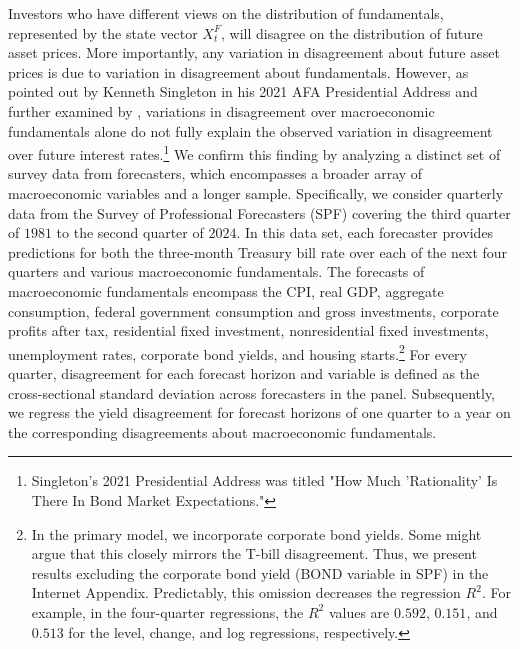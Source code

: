 \documentclass[preprint,11pt,authoryear]{elsarticle}
\theoremstyle{plain}
\begin{document}
Investors who have different views on the distribution of fundamentals, represented by the state vector $X_t^F$, will disagree on the distribution of future asset prices. More importantly, any variation in disagreement about future asset prices is due to variation in disagreement about fundamentals. However, as pointed out by Kenneth Singleton in his 2021 AFA Presidential Address and further examined by \cite{GiacolettiLaursenSingleton2021}, variations in disagreement over macroeconomic fundamentals alone do not fully explain the observed variation in disagreement over future interest rates.\footnote{Singleton's 2021 Presidential Address was titled "How Much 'Rationality' Is There In Bond Market Expectations."} We confirm this finding by analyzing a distinct set of survey data from forecasters, which encompasses a broader array of macroeconomic variables and a longer sample. Specifically, we consider quarterly data from the Survey of Professional Forecasters (SPF) covering the third quarter of $1981$ to the second quarter of $2024$. In this data set, each forecaster provides predictions for both the three-month Treasury bill rate over each of the next four quarters and various macroeconomic fundamentals. The forecasts of macroeconomic fundamentals encompass the CPI, real GDP, aggregate consumption, federal government consumption and gross investments, corporate profits after tax, residential fixed investment, nonresidential fixed investments, unemployment rates, corporate bond yields, and housing starts.\footnote{In the primary model, we incorporate corporate bond yields. Some might argue that this closely mirrors the T-bill disagreement. Thus, we present results excluding the corporate bond yield (BOND variable in SPF) in the Internet Appendix. Predictably, this omission decreases the regression $R^2$. For example, in the four-quarter regressions, the $R^2$ values are $0.592$, $0.151$, and $0.513$ for the level, change, and log regressions, respectively.} For every quarter, disagreement for each forecast horizon and variable is defined as the cross-sectional standard deviation across forecasters in the panel. Subsequently, we regress the yield disagreement for forecast horizons of one quarter to a year on the corresponding disagreements about macroeconomic fundamentals. 
\end{document}
